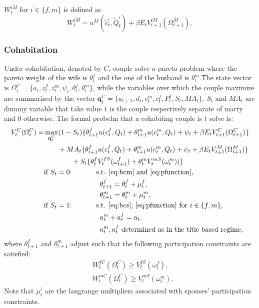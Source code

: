 \documentclass[12pt]{article}
\numberwithin{table}{section}
\begin{document}
$W_{t}^{i\overline{M}}$ for $i\in\{f,m\}$ is defined as 
\begin{equation}
W_{t}^{i\overline{M}}=u^M(\tilde{c}_t^{i},\tilde{Q}_t^{i})+\beta E_t V_{t+1}^{i\overline{M}}(\Omega^{\overline{M}}_{t+1}),
\end{equation}
\subsubsection*{Cohabitation}
Under cohabitation, denoted by $C$, couple solve a pareto problem where the pareto weight of the wife is $\theta^f_t$ and the one of the husband is $\theta^m_t$.The state vector is $\Omega^{C}_t=\{a_t,z^f_t,z^m_t,\psi_t,\theta^f_t,\theta^m_t\}$, while the variables over which the couple maximize are summarized by the vector $\mathbf{q}^C_t=\{a_{t+1},d_t,c^m_t,c^f_t,P^f_t,S_t,MA_t\}$. $S_t$ and ${MA}_t$ are dummy variable that take value $1$ is the couple respectively separate of marry and 0 otherwise. The formal probelm that a cohabiting couple is $t$ solve is:
\begin{equation}\label{eq:v_coh}
\begin{split}
V_t^{C}(\Omega^{C}_t)=&\max_{\mathbf{q}^C_t} (1-S_t)\{\theta^f_{t+1} u(c^f_t,Q_t)+\theta^m_{t+1} u(c^m_t,Q_t)+\psi_t+\beta E_t V^{C}_{t+1}(\Omega^{C}_{t+1})\}
\\ &\quad\quad+MA_t\{\theta^f_{t+1} u(c^f_t,Q_t)+\theta^m_{t+1} u(c^m_t,Q_t)+\psi_t+\beta E_t V^{M}_{t+1}(\Omega^{M}_{t+1})\}\\ &\quad\quad\quad\quad+S_t \{\theta^f_{t}V^{fS}_{t}(\omega^{f}_{t+1})+\theta^m_{t} V^{mS}_{t}(\omega^{m}_{t}))\}
\\ &\text{if $S_t=0$:}\hspace{35pt}\text{s.t. \eqref{eq:bcm} and \eqref{eq:pfunction},}\\ &\hspace{80pt}
\theta^f_{t+1}=\theta^f_{t}+\mu^f_t,\\ &\hspace{80pt}
\theta^m_{t+1}=\theta^m_{t}+\mu^m_t,
\\ &\text{if $S_t=1$:}\hspace{35pt}\text{s.t. \eqref{eq:bcs}, \eqref{eq:pfunction} for $i\in\{f,m\}$,}\\ &
\hspace{80pt}a_t^m+a_t^f= a_t,	\\ &
\hspace{80pt}a_t^m,a_t^f\text{ determined as in the title based regime},
\end{split}
\end{equation}
where $\theta^f_{t+1}$ and $\theta^m_{t+1}$ adjust such that the following participation constraints are satisfied:
\begin{equation}\label{eq:p_cons_coh}
\begin{split}
&
W^{fC}_{t}(\Omega^{C}_{t})\geq V_{t}^{fS}(\omega^f_{t}),\\ &
W^{mC}_{t}(\Omega^{C}_{t})\geq V_{t}^{mS}(\omega^m_{t}). 
\end{split}
\end{equation}
Note that $\mu^i_t$ are the langrange multipliers associated with spouses' participation constraints.
\end{document}
